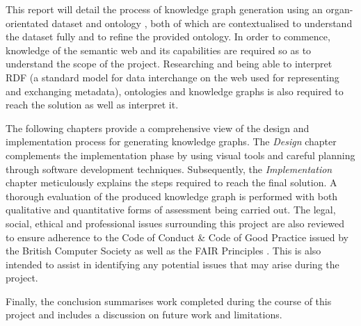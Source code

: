 This report will detail the process of knowledge graph generation using an organ-orientated dataset and ontology \cite{organontology}, both of which are contextualised to understand the dataset fully and to refine the provided ontology. In order to commence, knowledge of the semantic web and its capabilities are required so as to understand the scope of the project. Researching and being able to interpret RDF (a standard model for data interchange on the web used for representing and exchanging metadata), ontologies and knowledge graphs is also required to reach the solution as well as interpret it. 

The following chapters provide a comprehensive view of the design and implementation process for generating knowledge graphs. The \textit{Design} chapter complements the implementation phase by using visual tools and careful planning through software development techniques. Subsequently, the \textit{Implementation} chapter meticulously explains the steps required to reach the final solution. A thorough evaluation of the produced knowledge graph is performed with both qualitative and quantitative forms of assessment being carried out. The legal, social, ethical and professional issues surrounding this project are also reviewed to ensure adherence to the Code of Conduct \& Code of Good Practice issued by the British Computer Society \cite{bcs} as well as the FAIR Principles \cite{fairprinciples}. This is also intended to assist in identifying any potential issues that may arise during the project.

Finally, the conclusion summarises work completed during the course of this project and includes a discussion on future work and limitations. 
